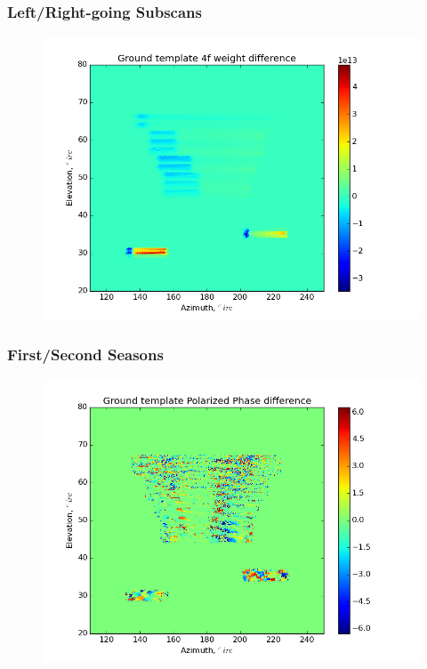 \documentclass{beamer}
\begin{document}
\begin{frame}
\frametitle{Left/Right-going Subscans}
\begin{figure}
\includegraphics[width=0.9\linewidth]{dw4_gt_LR_SUBSCAN.png}
\end{figure}
\end{frame}

\begin{frame}
\frametitle{First/Second Seasons}
\begin{figure}
\includegraphics[width=0.9\linewidth]{dArg_gt_FIRST_SECOND.png}
\end{figure}
\end{frame}
\end{document}
